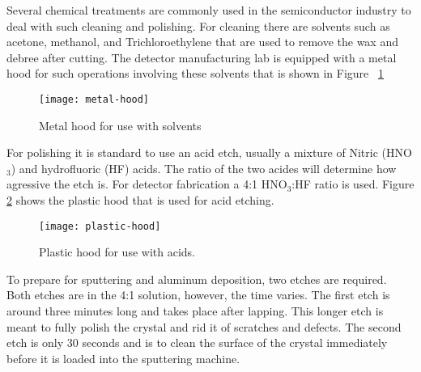 Several chemical treatments are commonly used in the semiconductor industry to deal with such cleaning and polishing.
For cleaning there are solvents such as acetone, methanol, and Trichloroethylene that are used to remove the wax and debree after cutting.
The detector manufacturing lab is equipped with a metal hood for such operations involving these solvents that is shown in Figure ~\ref{fig:metalhood}
\begin{figure}[htpb]
\centering
\texttt{[image: metal-hood]}
\caption{Metal hood for use with solvents}
\label{fig:metalhood}
\end{figure}

For polishing it is standard to use an acid etch, usually a mixture of Nitric (HNO$_3$) and hydrofluoric (HF) acids.
The ratio of the two acides will determine how agressive the etch is.
For detector fabrication a 4:1 HNO$_3$:HF ratio is used.
Figure \ref{fig:plastichood} shows the plastic hood that is used for acid etching.
\begin{figure}[htpb]
\centering
\texttt{[image: plastic-hood]}
\caption{Plastic hood for use with acids.}
\label{fig:plastichood}
\end{figure}
To prepare for sputtering and aluminum deposition, two etches are required.
Both etches are in the 4:1 solution, however, the time varies.
The first etch is around three minutes long and takes place after lapping.
This longer etch is meant to fully polish the crystal and rid it of scratches and defects.
The second etch is only 30 seconds and is to clean the surface of the crystal immediately before it is loaded into the sputtering machine.


